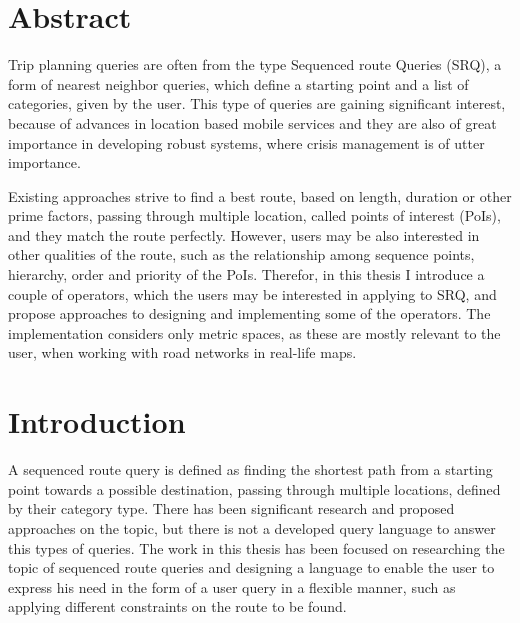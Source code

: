 \documentclass[12pt, a4paper]{book}
\begin{document}
\frontmatter
{}







\chapter{Abstract}

Trip planning queries are often from the type Sequenced route Queries (SRQ), a form of nearest neighbor queries, which define a starting point and a list of categories, given by the user. This type of queries are gaining significant interest, because of advances in location based mobile services and they are also of great importance in developing robust systems, where crisis management is of utter importance. 

\noindent Existing approaches strive to find a best route, based on length, duration or other prime factors, passing through multiple location, called points of interest (PoIs), and they match the route perfectly. However, users may be also interested in other qualities of the route, such as the relationship among sequence points, hierarchy, order and priority of the PoIs. Therefor, in this thesis  I introduce a couple of operators, which the users may be interested in applying to SRQ, and propose approaches to designing and implementing some of the operators. The implementation considers only metric spaces, as these are mostly relevant to the user, when working with road networks in real-life maps.

\mainmatter
\cleardoublepage
{}
{}
\tableofcontents 

\chapter{Introduction}
\label{sec:intro}
A sequenced route query is defined as finding the shortest path from a starting point towards a possible destination, passing through multiple locations, defined by their category type. There has been significant research and proposed approaches on the topic, but there is not a developed query language to answer this types of queries. The work in this thesis has been focused on researching the topic of sequenced route queries and designing a language to enable the user to express his need in the form of a user query in a flexible manner, such as applying different constraints on the route to be found. 
\end{document}
